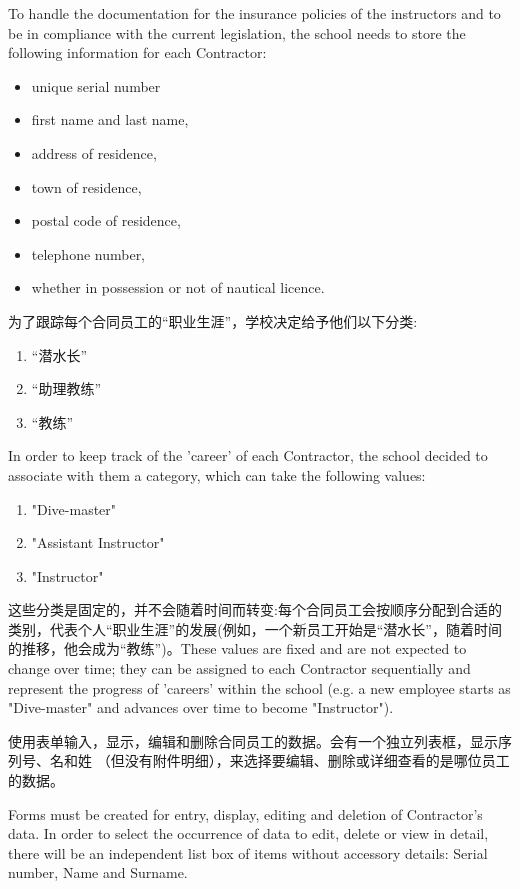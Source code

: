 To handle the documentation for the insurance policies of the
instructors and to be in compliance with the current legislation, the
school needs to store the following information for each Contractor:

\begin{itemize}
\tightlist
\item
  unique serial number
\item
  first name and last name,
\item
  address of residence,
\item
  town of residence,
\item
  postal code of residence,
\item
  telephone number,
\item
  whether in possession or not of nautical licence.
\end{itemize}

为了跟踪每个合同员工的``职业生涯''，学校决定给予他们以下分类:

\begin{enumerate}
\tightlist
\item
  ``潜水长''
\item
  ``助理教练''
\item
  ``教练''
\end{enumerate}

In order to keep track of the 'career' of each Contractor, the school
decided to associate with them a category, which can take the following
values:

\begin{enumerate}
\tightlist
\item
  "Dive-master"
\item
  "Assistant Instructor"
\item
  "Instructor"
\end{enumerate}

这些分类是固定的，并不会随着时间而转变:每个合同员工会按顺序分配到合适的类别，代表个人``职业生涯''的发展(例如，一个新员工开始是``潜水长''，随着时间的推移，他会成为``教练'')。These
values are fixed and are not expected to change over time; they can be
assigned to each Contractor sequentially and represent the progress of
'careers' within the school (e.g. a new employee starts as "Dive-master"
and advances over time to become "Instructor").

使用表单输入，显示，编辑和删除合同员工的数据。会有一个独立列表框，显示序列号、名和姓
（但没有附件明细），来选择要编辑、删除或详细查看的是哪位员工的数据。

Forms must be created for entry, display, editing and deletion of
Contractor's data. In order to select the occurrence of data to edit,
delete or view in detail, there will be an independent list box of items
without accessory details: Serial number, Name and Surname.


